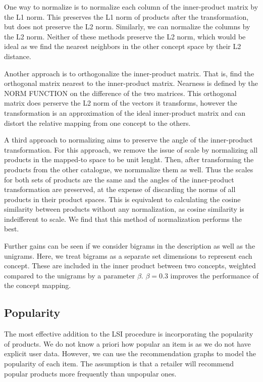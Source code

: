 \documentclass[11pt]{article}
\begin{document}
One way to normalize is to normalize each column of the inner-product matrix by
the L1 norm. This preserves the L1 norm of products after the transformation,
but does not preserve the L2 norm. Similarly, we can normalize the columns by
the L2 norm. Neither of these methods preserve the L2 norm, which would be ideal
as we find the nearest neighbors in the other concept space by their L2
distance.

Another approach is to orthogonalize the inner-product matrix. That is, find the
orthogonal matrix nearest to the inner-product matrix. Nearness is defined by
the NORM FUNCTION on the difference of the two matrices. This orthogonal matrix
does perserve the L2 norm of the vectors it transforms, however the
transformation is an approximation of the ideal inner-product matrix and can
distort the relative mapping from one concept to the others.

A third approach to normalizing aims to preserve the angle of the inner-product
transformation. For this approach, we remove the issue of scale by normalizing
all products in the mapped-to space to be unit lenght. Then, after transforming
the products from the other catalogue, we normmalize them as well. Thus the
scales for both sets of products are the same and the angles of the
inner-product transformation are preserved, at the expense of discarding the
norms of all products in their product spaces. This is equivalent to calculating
the cosine similarity between products without any normalization, as cosine
similarity is indeifferent to scale. We find that this method of normalization
performs the best.

Further gains can be seen if we consider bigrams in the description as well as
the unigrams. Here, we treat bigrams as a separate set dimensions to represent
each concept. These are included in the inner product between two concepts,
weighted compared to the unigrams by a parameter $\beta$. $\beta = 0.3$ improves the
performance of the concept mapping.

\subsection*{Popularity}
The most effective addition to the LSI procedure is incorporating the popularity
of products. We do not know a priori how popular an item is as we do not have
explicit user data. However, we can use the recommendation graphs to model the
popularity of each item. The assumption is that a retailer will recommend
popular products more frequently than unpopular ones.
\end{document}
